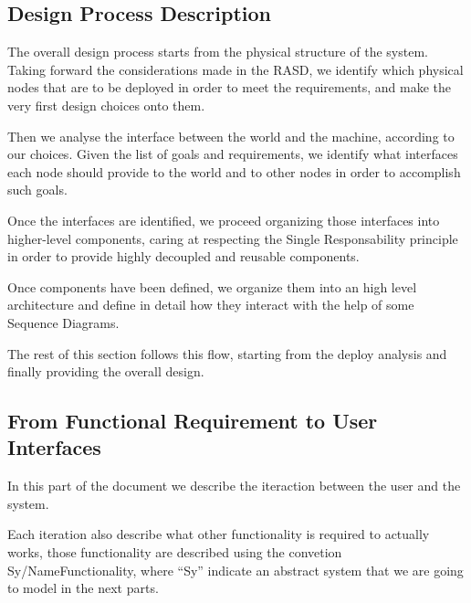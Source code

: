 \documentclass[11pt]{article} %
\begin{document}
\subsection{Design Process Description}

The overall design process starts from the physical structure of the system. Taking forward the considerations made in the RASD, we identify which physical nodes that are to be deployed in order to meet the requirements, and make the very first design choices onto them.

Then we analyse the interface between the world and the machine, according to our choices. Given the list of goals and requirements, we identify what interfaces each node should provide to the world and to other nodes in order to accomplish such goals.

Once the interfaces are identified, we proceed organizing those interfaces into higher-level components, caring at respecting the Single Responsability principle in order to provide highly decoupled and reusable components.

Once components have been defined, we organize them into an high level architecture and define in detail how they interact with the help of some Sequence Diagrams.

The rest of this section follows this flow, starting from the deploy analysis and finally providing the overall design.

\subsection{From Functional Requirement to User Interfaces}

In this part of the document we describe the iteraction between the user and the system.

Each iteration also describe what other functionality is required to actually works, those functionality are described using the convetion Sy/NameFunctionality, where ``Sy'' indicate an abstract system that we are going to model in the next parts.
\end{document}
